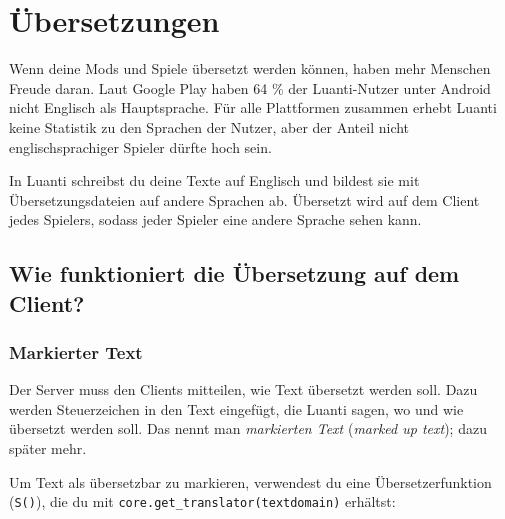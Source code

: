 \chapter{Übersetzungen}
\label{ch:quality/translations}

Wenn deine Mods und Spiele übersetzt werden können, haben mehr Menschen
Freude daran. Laut Google Play haben 64 \% der Luanti-Nutzer unter
Android nicht Englisch als Hauptsprache. Für alle Plattformen zusammen
erhebt Luanti keine Statistik zu den Sprachen der Nutzer, aber der
Anteil nicht englischsprachiger Spieler dürfte hoch sein.

In Luanti schreibst du deine Texte auf Englisch und bildest sie mit
Übersetzungsdateien auf andere Sprachen ab. Übersetzt wird auf dem
Client jedes Spielers, sodass jeder Spieler eine andere Sprache sehen
kann.

\section{Wie funktioniert die Übersetzung auf dem
Client?}\label{wie-funktioniert-die-uxfcbersetzung-auf-dem-client}

\subsection{Markierter Text}\label{markierter-text}

Der Server muss den Clients mitteilen, wie Text übersetzt werden soll.
Dazu werden Steuerzeichen in den Text eingefügt, die Luanti sagen, wo
und wie übersetzt werden soll. Das nennt man \emph{markierten Text}
(\emph{marked up text}); dazu später mehr.

Um Text als übersetzbar zu markieren, verwendest du eine
Übersetzerfunktion (\texttt{S()}), die du mit
\texttt{core.\allowbreak{}get\_\allowbreak{}translator(textdomain)}
erhältst:

\begin{Shaded}
\begin{Highlighting}[]
  \OperatorTok{=} \OperatorTok{(}\OperatorTok{)}

\OperatorTok{(}\OperatorTok{,} \OperatorTok{\{}
     \OperatorTok{=}\OperatorTok{(}\OperatorTok{),}
\OperatorTok{\})}
\end{Highlighting}
\end{Shaded}

